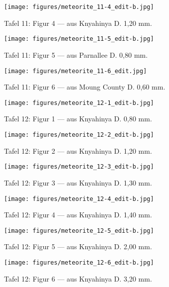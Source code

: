 \documentclass[a4paper, 12pt, oneside]{article}
\begin{document}
\clearpage
\begin{figure}[t]
\texttt{[image: figures/meteorite\_11-4\_edit-b.jpg]}
\caption{Tafel 11: Figur 4 --- aus Knyahinya D. 1,20 mm.}
\centering
\end{figure}
\clearpage
\begin{figure}[t]
\texttt{[image: figures/meteorite\_11-5\_edit-b.jpg]}
\caption{Tafel 11: Figur 5 --- aus Parnallee D. 0,80 mm.}
\centering
\end{figure}
\clearpage
\begin{figure}[t]
\texttt{[image: figures/meteorite\_11-6\_edit.jpg]}
\caption{Tafel 11: Figur 6 --- aus Moung County D. 0,60 mm.}
\centering
\end{figure}
\clearpage
{}
\begin{figure}[t]
\texttt{[image: figures/meteorite\_12-1\_edit-b.jpg]}
\caption{Tafel 12: Figur 1 --- aus Knyahinya D. 0,80 mm.}
\centering
\end{figure}
\clearpage
\begin{figure}[t]
\texttt{[image: figures/meteorite\_12-2\_edit-b.jpg]}
\caption{Tafel 12: Figur 2 --- aus Knyahinya D. 1,20 mm.}
\centering
\end{figure}
\clearpage
\begin{figure}[t]
\texttt{[image: figures/meteorite\_12-3\_edit-b.jpg]}
\caption{Tafel 12: Figur 3 --- aus Knyahinya D. 1,30 mm.}
\centering
\end{figure}
\clearpage
\begin{figure}[t]
\texttt{[image: figures/meteorite\_12-4\_edit-b.jpg]}
\caption{Tafel 12: Figur 4 --- aus Knyahinya D. 1,40 mm.}
\centering
\end{figure}
\clearpage
\begin{figure}[t]
\texttt{[image: figures/meteorite\_12-5\_edit-b.jpg]}
\caption{Tafel 12: Figur 5 --- aus Knyahinya D. 2,00 mm.}
\centering
\end{figure}
\clearpage
\begin{figure}[t]
\texttt{[image: figures/meteorite\_12-6\_edit-b.jpg]}
\caption{Tafel 12: Figur 6 --- aus Knyahinya D. 3,20 mm.}
\centering
\end{figure}
\end{document}
